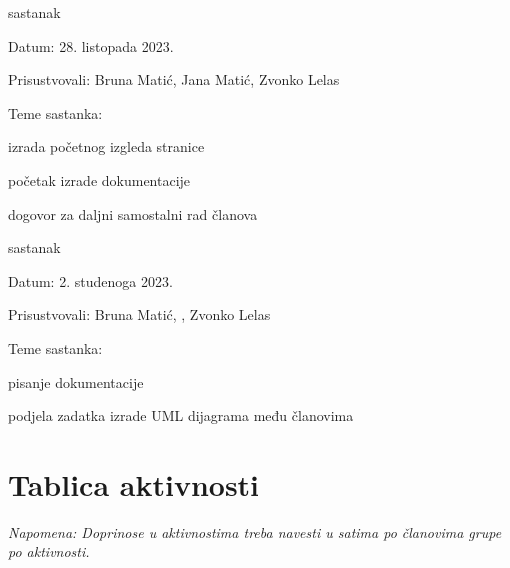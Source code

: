 \begin{packed_enum}
			\item  sastanak
			
			\item[] \begin{packed_item}
				\item Datum: 28. listopada 2023.
				\item Prisustvovali: Bruna Matić, Jana Matić, Zvonko Lelas
				\item Teme sastanka:
				\begin{packed_item}
					\item  izrada početnog izgleda stranice
					\item početak izrade dokumentacije
					\item dogovor za daljni samostalni rad članova
				\end{packed_item}
			\end{packed_item}

			\item  sastanak
			
			\item[] \begin{packed_item}
				\item Datum: 2. studenoga 2023.
				\item Prisustvovali: Bruna Matić, , Zvonko Lelas
				\item Teme sastanka:
				\begin{packed_item}
					\item  pisanje dokumentacije
					\item podjela zadatka izrade UML dijagrama među članovima
				\end{packed_item}
			\end{packed_item}
			
		\end{packed_enum}
		
		\eject
		\section*{Tablica aktivnosti}
			
			 \textit{Napomena: Doprinose u aktivnostima treba navesti u satima po članovima grupe po aktivnosti.}

